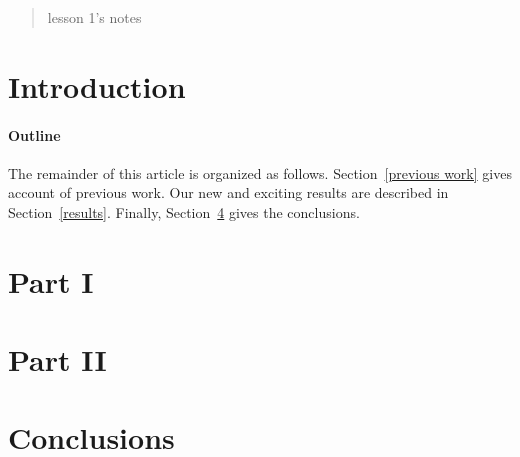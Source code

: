 \documentclass[10pt]{article}
\begin{document}
\maketitle

\begin{abstract}lesson 1's notes
\end{abstract}

\section{Introduction}

\paragraph{Outline}
The remainder of this article is organized as follows.
Section~\ref{previous work} gives account of previous work.
Our new and exciting results are described in Section~\ref{results}.
Finally, Section~\ref{conclusions} gives the conclusions.

\section{Part I}\label{Part I}


\section{Part II}\label{Part II}



\section{Conclusions}\label{conclusions}



\end{document}

